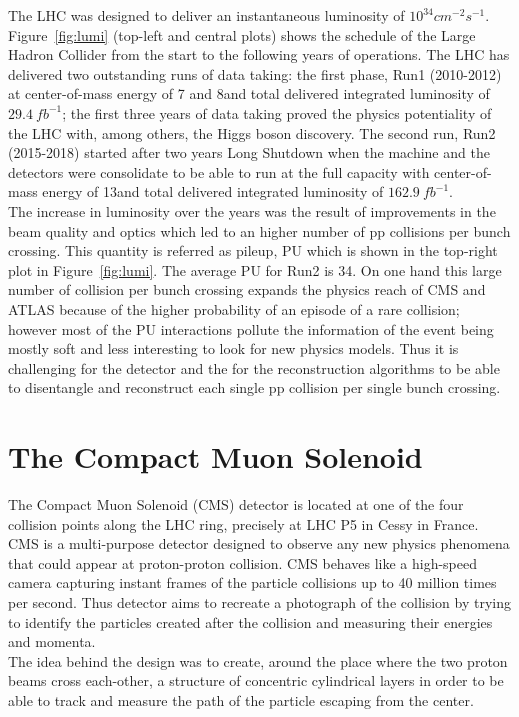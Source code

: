 The LHC was designed to deliver an instantaneous luminosity
of $10^{34}cm^{-2}s^{-1}$.\\
Figure~\ref{fig:lumi} (top-left and central
plots) shows the schedule of the Large Hadron Collider from the start
to the following years of operations. The LHC has delivered two
outstanding runs of data taking: the first phase, Run1 (2010-2012) at
center-of-mass energy of 7 and 8\TeV and total delivered integrated
luminosity of $29.4\ fb^{-1}$; the first three years of data taking proved
the physics potentiality of the LHC with, among others, the Higgs boson
discovery. The second run, Run2 (2015-2018) started after two years Long
Shutdown when the machine and the detectors were 
consolidate to be able to run at the full capacity with 
center-of-mass energy of 13\TeV and total delivered integrated
luminosity of $162.9\ fb^{-1}$.\\
The increase in luminosity over the
years was the result of improvements in the beam quality and optics which
led to an higher number of pp collisions per bunch crossing. This
quantity is referred as pileup, PU which is shown in the top-right plot
in Figure~\ref{fig:lumi}. The average \textlangle{}PU\textrangle{} for
Run2 is 34. On one hand this large
number of collision per bunch crossing 
expands the physics reach of CMS and ATLAS because of
the higher probability of an episode of a rare collision; however
most of the PU interactions pollute the information of the
event being mostly soft and less interesting to look for
new physics models. Thus it is challenging for the detector and the for
the reconstruction algorithms to be able 
to disentangle and reconstruct each single pp collision per single
bunch crossing.

\section{The Compact Muon Solenoid}\label{cms}

The Compact Muon Solenoid (CMS) detector is located at one of the four
collision points along the LHC ring, precisely at LHC P5 in Cessy in
France.  \\
CMS is a multi-purpose detector designed to observe any new physics
phenomena that could appear at proton-proton collision. CMS behaves
like a high-speed camera capturing instant frames of the particle
collisions up to 40 million times per second. Thus detector aims to recreate a
photograph of the collision by trying to
identify the particles created after the collision and
measuring their energies and momenta. \\
The idea behind the design was to create, around the place where the
two proton beams cross each-other, a structure of concentric cylindrical layers
in order to be able to track and measure the path of the particle
escaping from the center.   

